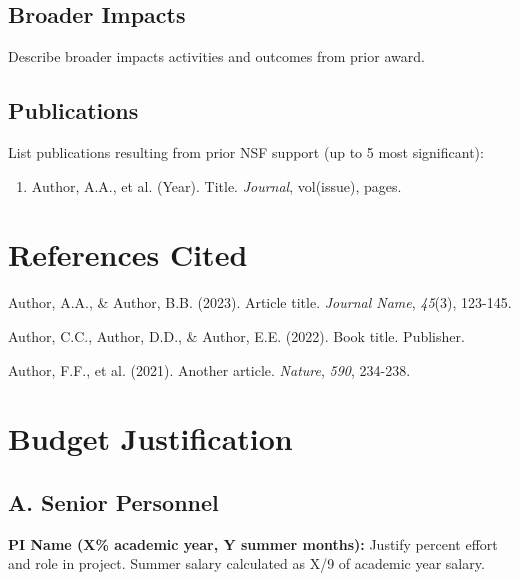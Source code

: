 \documentclass[11pt,letterpaper]{article}
\begin{document}
\subsection{Broader Impacts}
Describe broader impacts activities and outcomes from prior award.

\subsection{Publications}
List publications resulting from prior NSF support (up to 5 most significant):
\begin{enumerate}
    \item Author, A.A., et al. (Year). Title. \textit{Journal}, vol(issue), pages.
\end{enumerate}

\newpage


\section*{References Cited}

\begin{thebibliography}{99}

Author, A.A., \& Author, B.B. (2023). Article title. \textit{Journal Name}, \textit{45}(3), 123-145.

Author, C.C., Author, D.D., \& Author, E.E. (2022). Book title. Publisher.

Author, F.F., et al. (2021). Another article. \textit{Nature}, \textit{590}, 234-238.


\end{thebibliography}

\newpage


\section*{Budget Justification}

\subsection*{A. Senior Personnel}
\textbf{PI Name (X\% academic year, Y summer months):} Justify percent effort and role in project. Summer salary calculated as X/9 of academic year salary.
\end{document}
